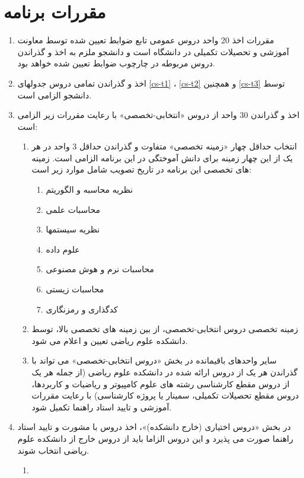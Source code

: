 \documentclass{article}
\begin{document}
    \section{مقررات برنامه}
    \begin{enumerate}
        \item
        مقررات اخذ 20 واحد دروس عمومی تابع ضوابط تعیین شده توسط معاونت آموزشی و تحصیلات تکمیلی در دانشگاه است و دانشجو ملزم به اخذ و گذراندن دروس مربوطه در چارچوب ضوابط تعیین شده خواهد بود.
        \item
        اخذ و گذراندن تمامی دروس جدولهای
        \ref{cs-t1}
        ،
        \ref{cs-t2}
        و همچنین
        \ref{cs-t3}
         توسط دانشجو الزامی است.
        \item
        اخذ و گذراندن 30 واحد از دروس «انتخابی-تخصصی» با رعایت مقررات زیر الزامی است:
        \begin{enumerate}
            \item
            انتخاب حداقل چهار «زمینه تخصصی» متفاوت و گذراندن حداقل 3 واحد در هر یک از این چهار زمینه برای دانش آموختگی در این برنامه الزامی است. زمینه های تخصصی این برنامه در تاریخ تصویب شامل موارد زیر است:
            \begin{enumerate}
                \item
                نظریه محاسبه و الگوریتم
                \item
                 محاسبات علمی
                \item
                 نظریه سیستمها
                \item
                 علوم داده
                \item
                 محاسبات نرم و هوش مصنوعی
                \item
                 محاسبات زیستی
                \item
                 کدگذاری و رمزنگاری
            \end{enumerate}
            \item 
            زمینه تخصصی دروس انتخابی-تخصصی، از بین زمینه های تخصصی بالا، توسط دانشکده علوم ریاضی تعیین و اعلام می شود.
            \item
             سایر واحدهای باقیمانده در بخش «دروس انتخابی-تخصصی» می تواند با گذراندن هر یک از دروس ارائه شده در دانشکده علوم ریاضی (از جمله هر یک از دروس مقطع کارشناسی رشته های علوم کامپیوتر و ریاضیات و کاربردها، دروس مقطع تحصیلات تکمیلی، سمینار یا پروژه کارشناسی) با رعایت مقررات آموزشی و تایید استاد راهنما تکمیل شود.
        \end{enumerate}
        \item 
        در بخش  «دروس اختیاری (خارج دانشکده)»، اخذ دروس با مشورت و تایید استاد راهنما صورت می پذیرد و این دروس الزاما باید از دروس خارج از دانشکده علوم ریاضی انتخاب شوند. 
        \begin{enumerate}
        	\item
        

\end{enumerate}
\end{enumerate}
\end{document}
